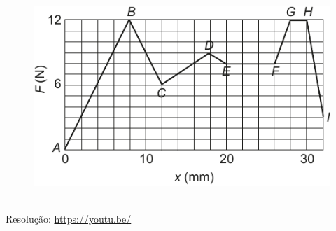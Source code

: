 \begin{figure}[H]
    \centering
    \includegraphics[width=0.99\linewidth]{Q142-R}
    \caption{}
    \label{fig:q142-r}
\end{figure}


\begin{center}
    \href{https://youtu.be/}{
    }\\
    Resolução: \url{https://youtu.be/}
\end{center}
